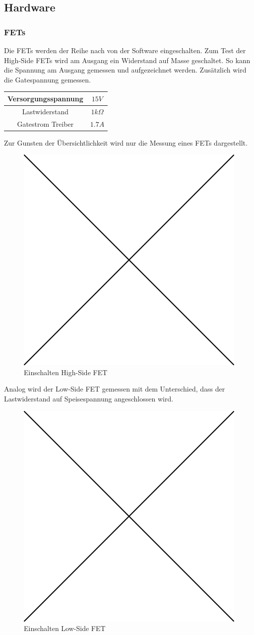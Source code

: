 \subsection*{Hardware}
\subsubsection*{FETs}
Die FETs werden der Reihe nach von der Software eingeschalten. Zum Test der High-Side FETs wird am Ausgang ein Widerstand auf Masse geschaltet. So kann die Spannung am Ausgang gemessen und aufgezeichnet werden. Zusätzlich wird die Gatespannung gemessen.

\begin{center}
	\begin{tabular}{|c|c|}
		\hline 
		Versorgungsspannung & $15V$ \\ \hline
		Lastwiderstand & $1k\Omega$ \\ \hline
		Gatestrom Treiber & $1.7A$ \\ \hline
	\end{tabular} 
	\label{tab:fetmessbed}
\end{center}

Zur Gunsten der Übersichtlichkeit wird nur die Messung eines FETs dargestellt.

\begin{figure} [H]
	\centering
	\includegraphics[width=0.5\linewidth]{images/placeholder.png}
	\caption{Einschalten High-Side FET}
	\label{fig:hsfet}
\end{figure}

Analog wird der Low-Side FET gemessen mit dem Unterschied, dass der Lastwiderstand auf Speisespannung angeschlossen wird.

\begin{figure} [H]
	\centering
	\includegraphics[width=0.5\linewidth]{images/placeholder.png}
	\caption{Einschalten Low-Side FET}
	\label{fig:hsfet}
\end{figure}

